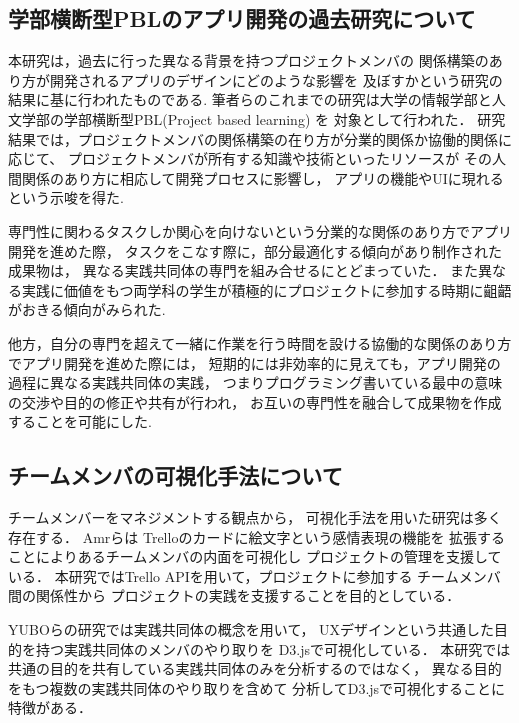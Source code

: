 \subsection{学部横断型PBLのアプリ開発の過去研究について}
本研究は，過去に行った異なる背景を持つプロジェクトメンバの
関係構築のあり方が開発されるアプリのデザインにどのような影響を
及ぼすかという研究\cite{preStudy}の結果に基に行われたものである.
筆者らのこれまでの研究は大学の情報学部と人文学部の学部横断型PBL(Project based learning) を
対象として行われた．
研究結果では，プロジェクトメンバの関係構築の在り方が分業的関係か協働的関係に応じて、
プロジェクトメンバが所有する知識や技術といったリソースが
その人間関係のあり方に相応して開発プロセスに影響し，
アプリの機能やUIに現れるという示唆を得た.

専門性に関わるタスクしか関心を向けないという分業的な関係のあり方でアプリ開発を進めた際，
タスクをこなす際に，部分最適化する傾向があり制作された成果物は，
異なる実践共同体の専門を組み合せるにとどまっていた．
また異なる実践に価値をもつ両学科の学生が積極的にプロジェクトに参加する時期に齟齬がおきる傾向がみられた.

他方，自分の専門を超えて一緒に作業を行う時間を設ける協働的な関係のあり方
でアプリ開発を進めた際には，
短期的には非効率的に見えても，アプリ開発の過程に異なる実践共同体の実践，
つまりプログラミング書いている最中の意味の交渉や目的の修正や共有が行われ，
お互いの専門性を融合して成果物を作成することを可能にした.

\subsection{チームメンバの可視化手法について}
チームメンバーをマネジメントする観点から，
可視化手法を用いた研究は多く存在する．
Amrら\cite{Emotimonitor}は
Trelloのカードに絵文字という感情表現の機能を
拡張することによりあるチームメンバの内面を可視化し
プロジェクトの管理を支援している．
本研究ではTrello APIを用いて，プロジェクトに参加する
チームメンバ間の関係性から
プロジェクトの実践を支援することを目的としている．　


YUBOら\cite{D3jsOfCop}の研究では実践共同体の概念を用いて，
UXデザインという共通した目的を持つ実践共同体のメンバのやり取りを
D3.jsで可視化している．
本研究では共通の目的を共有している実践共同体のみを分析するのではなく，
異なる目的をもつ複数の実践共同体のやり取りを含めて
分析してD3.jsで可視化することに特徴がある．



